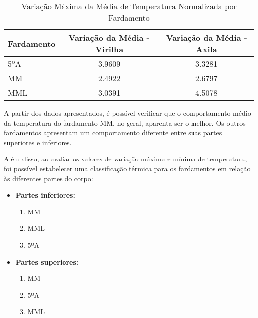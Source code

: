         \begin{table}[H]
            \centering
            \begin{tabular}{lcc}
            \hline
            Fardamento & Variação da Média - Virilha & Variação da Média - Axila \\
            \hline
            5ºA & 3.9609 & 3.3281 \\ 
            MM & 2.4922 & 2.6797 \\ 
            MML & 3.0391 & 4.5078 \\ 
            \hline
            \end{tabular}
            \caption{Variação Máxima da Média de Temperatura Normalizada por Fardamento}
            \label{tab:maxmedia}
            \end{table}

        A partir dos dados apresentados, é possível verificar que o comportamento médio da temperatura 
        do fardamento \acrshort{MM}, no geral, aparenta ser o melhor. Os outros fardamentos 
        apresentam um comportamento diferente entre suas partes superiores e inferiores.

        Além disso, ao avaliar os valores de variação máxima e mínima de temperatura, foi possível estabelecer 
        uma classificação térmica para os fardamentos em relação às diferentes partes do corpo:       

        \begin{itemize}
            \item \textbf{Partes inferiores:}
            \begin{enumerate}[label=\Roman*.] %
            \item \acrlong{MM}
            \item \acrlong{MML}
            \item 5ºA
            \end{enumerate}

        
            \item \textbf{Partes superiores:}
            \begin{enumerate}[label=\Roman*.] %
            \item \acrlong{MM}
            \item 5ºA
            \item \acrlong{MML}
            \end{enumerate}

        
            \end{itemize}
            

